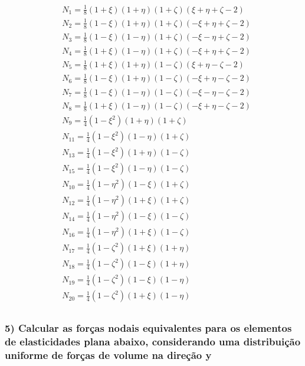 \begin{equation}
	\begin{split}
		& N_1 = \frac{1}{8}(1+\xi)(1+\eta)(1+\zeta)( \xi + \eta + \zeta - 2)\\
		& N_2 = \frac{1}{8}(1-\xi)(1+\eta)(1+\zeta)(-\xi + \eta + \zeta - 2)\\
		& N_3 = \frac{1}{8}(1-\xi)(1-\eta)(1+\zeta)(-\xi - \eta + \zeta - 2)\\
		& N_4 = \frac{1}{8}(1+\xi)(1-\eta)(1+\zeta)(-\xi + \eta + \zeta - 2)\\	
		& N_5 = \frac{1}{8}(1+\xi)(1+\eta)(1-\zeta)( \xi + \eta - \zeta - 2)\\
		& N_6 = \frac{1}{8}(1-\xi)(1+\eta)(1-\zeta)(-\xi + \eta - \zeta - 2)\\
		& N_7 = \frac{1}{8}(1-\xi)(1-\eta)(1-\zeta)(-\xi - \eta - \zeta - 2)\\
		& N_8 = \frac{1}{8}(1+\xi)(1-\eta)(1-\zeta)(-\xi + \eta - \zeta - 2)\\	
		& N_9    = \frac{1}{4}(1-\xi^2)(1+\eta)(1+\zeta)\\
		& N_{11} = \frac{1}{4}(1-\xi^2)(1-\eta)(1+\zeta)\\
		& N_{13} = \frac{1}{4}(1-\xi^2)(1+\eta)(1-\zeta)\\
		& N_{15} = \frac{1}{4}(1-\xi^2)(1-\eta)(1-\zeta)\\
		& N_{10} = \frac{1}{4}(1-\eta^2)(1-\xi)(1+\zeta)\\
		& N_{12} = \frac{1}{4}(1-\eta^2)(1+\xi)(1+\zeta)\\
		& N_{14} = \frac{1}{4}(1-\eta^2)(1-\xi)(1-\zeta)\\	
		& N_{16} = \frac{1}{4}(1-\eta^2)(1+\xi)(1-\zeta)\\		
		& N_{17} = \frac{1}{4}(1-\zeta^2)(1+\xi)(1+\eta)\\
		& N_{18} = \frac{1}{4}(1-\zeta^2)(1-\xi)(1+\eta)\\
		& N_{19} = \frac{1}{4}(1-\zeta^2)(1-\xi)(1-\eta)\\	
		& N_{20} = \frac{1}{4}(1-\zeta^2)(1+\xi)(1-\eta)\\	
	\end{split}
\end{equation}	
%
\subsubsection{5) Calcular as forças nodais equivalentes para os elementos de elasticidades plana abaixo, considerando uma distribuição uniforme de forças de volume na direção y}

